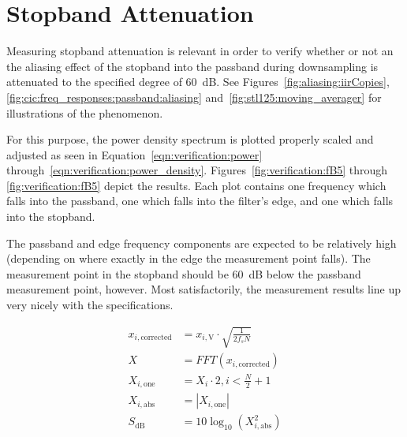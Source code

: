 %
%
\section{Stopband Attenuation} %
\label{sec:verification:snr}

Measuring stopband attenuation  is relevant in order to verify  whether or not
an the aliasing  effect of the stopband into the  passband during downsampling
is attenuated to the specified degree of \SI{60}{\dB}. See
Figures~\ref{fig:aliasing:iirCopies},
\ref{fig:cic:freq_responses:passband:aliasing}
and~\ref{fig:stl125:moving_averager} for illustrations of the phenomenon.

For this purpose,  the power density spectrum is plotted
properly scaled and adjusted  as seen in Equation~\ref{eqn:verification:power}
through~\ref{eqn:verification:power_density}. 
Figures~\ref{fig:verification:fB5}  through \ref{fig:verification:fB5}  depict
the results. Each plot  contains one frequency which falls  into the passband,
one which falls into the filter's edge, and one which falls into the stopband.

The passband and edge frequency components  are expected to be relatively high
(depending  on where  exactly in  the edge  the measurement  point falls). The
measurement point  in the stopband  should be \SI{60}{\dB} below  the passband
measurement point, however. Most satisfactorily,  the measurement results line
up very nicely with the specifications.

\begin{align}
    x_{i,\mathrm{corrected}} &= x_{i,\mathrm{V}} \cdot \sqrt{\frac{1}{2f_s N}} \label{eqn:verification:power} \\
    X                        &= FFT\left(x_{i,\mathrm{corrected}}\right)       \\
    X_{i,\mathrm{one}}       &= X_i \cdot 2, i < \frac{N}{2}+1                 \\
    X_{i,\mathrm{abs}}       &= |X_{i,\mathrm{one}}|                           \\
    S_{\si{\dB}}             &= 10\log_{10}(X_{i,\mathrm{abs}}^2)              \label{eqn:verification:power_density}
\end{align}

